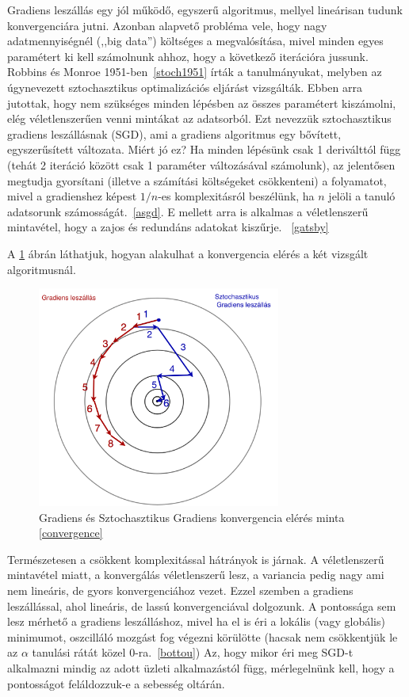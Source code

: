 \documentclass[a4paper,12pt]{article}
\begin{document}
Gradiens leszállás egy jól működő, egyszerű algoritmus, mellyel lineárisan tudunk konvergenciára jutni. Azonban alapvető probléma vele, hogy nagy adatmennyiségnél (,,big data'') költséges a megvalósítása, mivel minden egyes paramétert ki kell számolnunk ahhoz, hogy a következő iterációra jussunk. Robbins és Monroe 1951-ben~\ref{stoch1951} írták a tanulmányukat, melyben az úgynevezett sztochasztikus optimalizációs eljárást vizsgálták. Ebben arra jutottak, hogy nem szükséges minden lépésben az összes paramétert kiszámolni, elég véletlenszerűen venni mintákat az adatsorból. Ezt nevezzük sztochasztikus gradiens leszállásnak (SGD), ami a gradiens algoritmus egy bővített, egyszerűsített változata. \linebreak
Miért jó ez? Ha minden lépésünk csak 1 deriválttól függ (tehát 2 iteráció között csak 1 paraméter változásával számolunk), az jelentősen megtudja gyorsítani (illetve a számítási költségeket csökkenteni) a folyamatot, mivel a gradienshez képest $1/n$-es komplexitásról beszélünk, ha $n$ jelöli a tanuló adatsorunk számosságát.~\ref{asgd}. E mellett arra is alkalmas a véletlenszerű mintavétel, hogy a zajos és redundáns adatokat kiszűrje. ~\ref{gatsby} \linebreak

A \ref{sgd_bgd} ábrán láthatjuk, hogyan alakulhat a konvergencia elérés a két vizsgált algoritmusnál. 

\begin{figure}[H]
\centering
\includegraphics[width=80mm]{img/sgd_bgd.png}
\caption{Gradiens és Sztochasztikus Gradiens konvergencia elérés minta \ref{convergence} \label{sgd_bgd}}
\end{figure}

Természetesen a csökkent komplexitással hátrányok is járnak. A véletlenszerű mintavétel miatt, a konvergálás véletlenszerű lesz, a variancia pedig nagy ami nem lineáris, de gyors konvergenciához vezet. Ezzel szemben a gradiens leszállással, ahol lineáris, de lassú konvergenciával dolgozunk. A pontossága sem lesz mérhető a gradiens leszálláshoz, mivel ha el is éri a lokális (vagy globális) minimumot, oszcilláló mozgást fog végezni körülötte (hacsak nem csökkentjük le az $\alpha$ tanulási rátát közel 0-ra.~\ref{bottou})
Az, hogy mikor éri meg SGD-t alkalmazni mindig az adott üzleti alkalmazástól függ, mérlegelnünk kell, hogy a pontosságot feláldozzuk-e a sebesség oltárán. \linebreak
\end{document}
